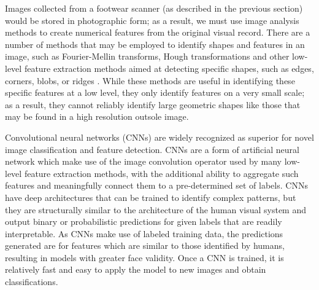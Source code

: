 \documentclass{article}\usepackage[]{graphicx}\usepackage[table]{xcolor}
\begin{document}
Images collected from a footwear scanner (as described in the previous section) would be stored in photographic form; as a result, we must use image analysis methods to create numerical features from the original visual record. There are a number of methods that may be employed to identify shapes and features in an image, such as Fourier-Mellin transforms, Hough transformations \citep{ballardGeneralizingHoughTransform1981} and other low-level feature extraction methods aimed at detecting specific shapes, such as edges, corners, blobs, or ridges \citep[Ch 15]{machineVision}. While these methods are useful in identifying these specific features at a low level, they only identify features on a very small scale; as a result, they cannot reliably identify large geometric shapes like those that may be found in a high resolution outsole image.

Convolutional neural networks (CNNs) are widely recognized as superior for novel image classification and feature detection. CNNs are a form of artificial neural network which make use of the image convolution operator used by many low-level feature extraction methods, with the additional ability to aggregate such features and meaningfully connect them to a pre-determined set of labels. CNNs have deep architectures that can be trained to identify complex patterns, but they are structurally similar to the architecture of the human visual system and output binary or probabilistic predictions for given labels that are readily interpretable. As CNNs make use of labeled training data, the predictions generated are for features which are similar to those identified by humans, resulting in models with greater face validity. Once a CNN is trained, it is relatively fast and easy to apply the model to new images and obtain classifications.
\end{document}
